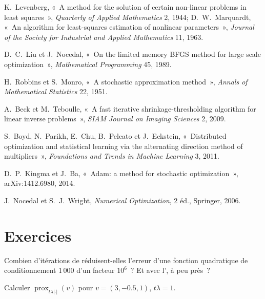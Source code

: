 \begin{omsources}
\item K.~Levenberg, «~A method for the solution of certain non-linear problems in least squares~», \emph{Quarterly of Applied Mathematics} 2, 1944; D.~W.~Marquardt, «~An algorithm for least-squares
estimation of nonlinear parameters~», \emph{Journal of the Society for Industrial and Applied Mathematics} 11, 1963.
\item D.~C.~Liu et J.~Nocedal, «~On the limited memory BFGS method for large scale optimization~», \emph{Mathematical Programming} 45, 1989.
\item H.~Robbins et S.~Monro, «~A stochastic approximation method~», \emph{Annals of Mathematical Statistics} 22, 1951.
\item A.~Beck et M.~Teboulle, «~A fast iterative shrinkage-thresholding algorithm for linear inverse problems~», \emph{SIAM Journal on Imaging Sciences} 2, 2009.
\item S.~Boyd, N.~Parikh, E.~Chu, B.~Peleato et J.~Eckstein, «~Distributed optimization and statistical learning via the alternating direction method of multipliers~», \emph{Foundations and Trends in
Machine Learning} 3, 2011.
\item D.~P.~Kingma et J.~Ba, «~Adam: a method for stochastic optimization~», arXiv:1412.6980, 2014.
\item J.~Nocedal et S.~J.~Wright, \emph{Numerical Optimization}, 2 éd., Springer, 2006.
\end{omsources}

\section{Exercices}

\begin{exercise}[$\star$]\label{exo:qm:numerical-optimisation-in-practice:1}
Combien d'itérations de  réduisent-elles l'erreur d'une fonction quadratique de conditionnement 1\,000 d'un facteur $10^{6}$~? Et avec l', à peu près~?
\end{exercise}

\begin{exercise}[$\star$]\label{exo:qm:numerical-optimisation-in-practice:2}
Calculer $\operatorname{prox}_{t\lambda|\cdot|}(v)$ pour $v = (3, -0.5, 1)$, $t\lambda = 1$.
\end{exercise}

